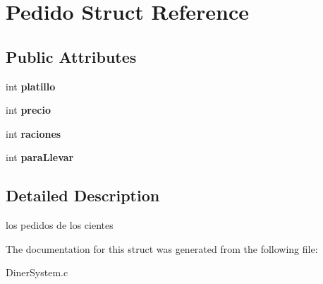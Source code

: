 \hypertarget{struct_pedido}{}\section{Pedido Struct Reference}
\label{struct_pedido}
\subsection*{Public Attributes}
\begin{DoxyCompactItemize}
\item 
\mbox{\label{struct_pedido_a03e7bc91ea56dfd733416e4c7468705d}} 
int {\bfseries platillo}
\item 
\mbox{\label{struct_pedido_a042a8e0f276deeec33704be78aa54d6c}} 
int {\bfseries precio}
\item 
\mbox{\label{struct_pedido_a50fd06e050ee7005d19ae2aa8aa73eb6}} 
int {\bfseries raciones}
\item 
\mbox{\label{struct_pedido_af42820665c52088233e1af1c1663ced2}} 
int {\bfseries para\+Llevar}
\end{DoxyCompactItemize}


\subsection{Detailed Description}
los pedidos de los cientes 

The documentation for this struct was generated from the following file\+:\begin{DoxyCompactItemize}
\item 
Diner\+System.\+c\end{DoxyCompactItemize}

